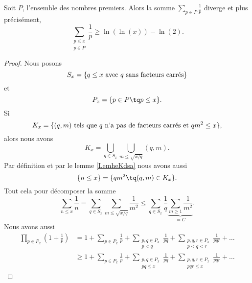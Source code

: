 \begin{theorem} \label{ThonfVruT}
    Soit \( P\), l'ensemble des nombres premiers. Alors la somme \( \sum_{p\in P}\frac{1}{ p }\) diverge et plus précisément,
    \begin{equation}
        \sum_{\substack{p\leq x\\p\in P}}\frac{1}{ p }\geq \ln(\ln(x))-\ln(2).
    \end{equation}
\end{theorem}

\begin{proof}
    Nous posons
    \begin{equation}
        S_x=\{ \text{\( q\leq x\) avec \( q\) sans facteurs carrés} \}
    \end{equation}
    et
    \begin{equation}
        P_x=\{ p\in P\tq p\leq x \}.
    \end{equation}
    Si
    \begin{equation}
        K_x=\{ \text{\( (q,m)\) tels que \( q\) n'a pas de facteurs carrés et \( qm^2\leq x\)} \},
    \end{equation}
    alors nous avons
    \begin{equation}
        K_x=\bigcup_{q\in S_x}\bigcup_{m\leq \sqrt{x/q}}(q,m).
    \end{equation}
    Par définition et par le lemme \ref{LemheKdsa} nous avons aussi
    \begin{equation}
        \{ n\leq x \}=\{ qm^2\tq (q,m)\in K_x \}.
    \end{equation}
    Tout cela pour décomposer la somme
    \begin{equation}        \label{EqpoJpuC}
        \sum_{n\leq x}\frac{1}{ n }=\sum_{q\in S_x}\sum_{m\leq\sqrt{x/q}}\frac{1}{ m^2 }\leq \sum_{q\in S_x}\frac{1}{ q }\underbrace{\sum_{m\geq 1}\frac{1}{ m^2 }}_{=C}.
    \end{equation}
    Nous avons aussi
    \begin{subequations}
        \begin{align}
            \prod_{p\in P_x}\left( 1+\frac{1}{ p } \right)&=1+\sum_{p\in P_x}\frac{1}{ p }+\sum_{\substack{p,q\in P_x\\p<q}}\frac{1}{ pq }+\sum_{\substack{p,q,r\in P_x\\p<q<r}}\frac{1}{ pqr }+\ldots\\
            &\geq 1+\sum_{p\in P_x}\frac{1}{ p }+\sum_{\substack{p,q\in P_x\\pq\leq x}}\frac{1}{ pq }+\sum_{\substack{p,q,r\in P_x\\pqr\leq x}}\frac{1}{ pqr }+\ldots

\end{align}
\end{subequations}
\end{proof}
